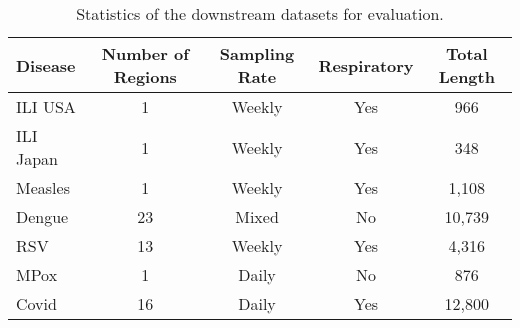\begin{table}[t]
\centering
\caption{Statistics of the downstream datasets for evaluation.}
\label{tab:downstream_datasets}
\scriptsize %
\setlength{\tabcolsep}{3pt} %
\begin{tabular}{lcccc}
\toprule
\textbf{Disease} & \textbf{Number of Regions} & \textbf{Sampling Rate} & \textbf{Respiratory} & \textbf{Total Length} \\
\midrule
ILI USA   & 1   & Weekly & Yes & 966 \\
ILI Japan & 1   & Weekly & Yes & 348 \\
Measles    & 1   & Weekly & Yes & 1{,}108 \\
Dengue     & 23  & Mixed  & No & 10{,}739 \\
RSV        & 13  & Weekly & Yes & 4{,}316 \\
MPox       & 1   & Daily  & No & 876 \\
Covid      & 16  & Daily  & Yes & 12{,}800 \\
\bottomrule
\end{tabular}
\end{table}


